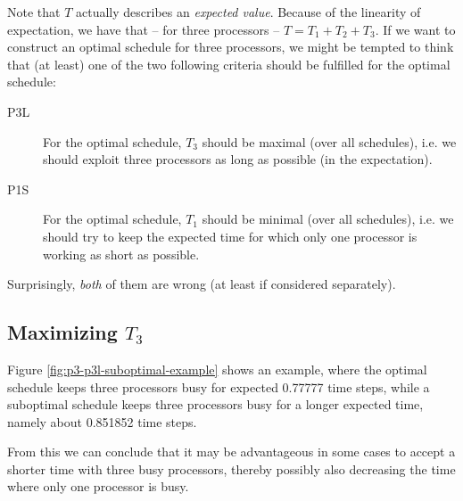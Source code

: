 Note that $T$ actually describes an \emph{expected value}. Because of the linearity of expectation, we have that -- for three processors -- $T=T_1 + T_2 + T_3$. If we want to construct an optimal schedule for three processors, we might be tempted to think that (at least) one of the two following criteria should be fulfilled for the optimal schedule:

\begin{description}
\item[P3L] For the optimal schedule, $T_3$ should be maximal (over all schedules), i.e. we should exploit three processors as long as possible (in the expectation).
\item[P1S] For the optimal schedule, $T_1$ should be minimal (over all schedules), i.e. we should try to keep the expected time for which only one processor is working as short as possible.
\end{description}

Surprisingly, \emph{both} of them are wrong (at least if considered separately).

\subsection{Maximizing $T_3$}
\label{sec:p3-disproving-long-p3}

Figure \ref{fig:p3-p3l-suboptimal-example} shows an example, where the optimal schedule keeps three processors busy for expected 0.77777 time steps, while a suboptimal schedule keeps three processors busy for a longer expected time, namely about 0.851852 time steps.

From this we can conclude that it may be advantageous in some cases to accept a shorter time with three busy processors, thereby possibly also decreasing the time where only one processor is busy.

